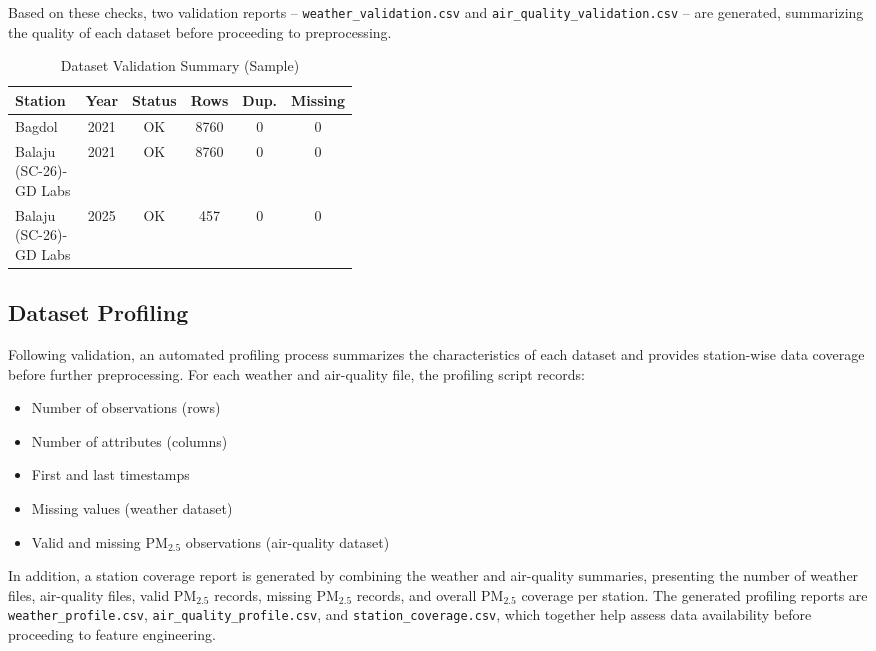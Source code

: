 Based on these checks, two validation reports -- \texttt{weather\_validation.csv} and
\texttt{air\_quality\_validation.csv} -- are generated, summarizing the quality of each
dataset before proceeding to preprocessing.

\begin{table}[H]
    \centering
    \small
    \caption{Dataset Validation Summary (Sample)}
    \label{tab:dataset_validation_summary}
    \renewcommand{\arraystretch}{1.3}
    \begin{tabular}{|p{0.40\linewidth}|c|c|c|c|c|}
        \hline
        \textbf{Station} & \textbf{Year} & \textbf{Status} & \textbf{Rows} & \textbf{Dup.} & \textbf{Missing} \\
        \hline
        Bagdol & 2021 & OK & 8760 & 0 & 0 \\
        \hline
        Balaju (SC-26)- GD Labs & 2021 & OK & 8760 & 0 & 0 \\
        \hline
        Balaju (SC-26)- GD Labs & 2025 & OK & 457 & 0 & 0 \\
        \hline
    \end{tabular}
\end{table}

\subsection{Dataset Profiling}

Following validation, an automated profiling process summarizes the characteristics of
each dataset and provides station-wise data coverage before further preprocessing. For
each weather and air-quality file, the profiling script records:

\begin{itemize}
    \item Number of observations (rows)
    \item Number of attributes (columns)
    \item First and last timestamps
    \item Missing values (weather dataset)
    \item Valid and missing PM$_{2.5}$ observations (air-quality dataset)
\end{itemize}

In addition, a station coverage report is generated by combining the weather and
air-quality summaries, presenting the number of weather files, air-quality files, valid
PM$_{2.5}$ records, missing PM$_{2.5}$ records, and overall PM$_{2.5}$ coverage per
station. The generated profiling reports are \texttt{weather\_profile.csv},
\texttt{air\_quality\_profile.csv}, and \texttt{station\_coverage.csv}, which together
help assess data availability before proceeding to feature engineering.

